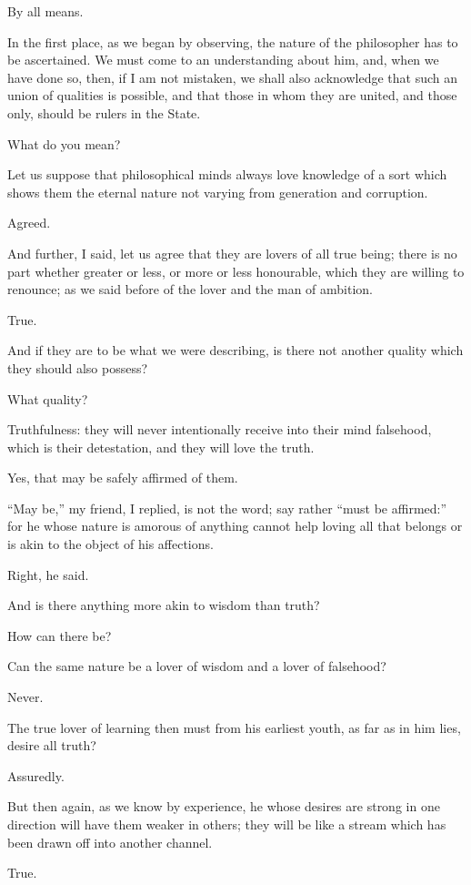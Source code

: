 By all means.

In the first place, as we began by observing, the nature of the
philosopher has to be ascertained. We must come to an understanding
about him, and, when we have done so, then, if I am not mistaken, we
shall also acknowledge that such an union of qualities is possible, and
that those in whom they are united, and those only, should be rulers in
the State.

What do you mean?

Let us suppose that philosophical minds always love knowledge of a sort
which shows them the eternal nature not varying from generation and
corruption.

Agreed.

And further, I said, let us agree that they are lovers of all true
being; there is no part whether greater or less, or more or less
honourable, which they are willing to renounce; as we said before of the
lover and the man of ambition.

True.

And if they are to be what we were describing, is there not another
quality which they should also possess?

What quality?

Truthfulness: they will never intentionally receive into their mind
falsehood, which is their detestation, and they will love the truth.

Yes, that may be safely affirmed of them.

``May be,'' my friend, I replied, is not the word; say rather ``must be
affirmed:'' for he whose nature is amorous of anything cannot help loving
all that belongs or is akin to the object of his affections.

Right, he said.

And is there anything more akin to wisdom than truth?

How can there be?

Can the same nature be a lover of wisdom and a lover of falsehood?

Never.

The true lover of learning then must from his earliest youth, as far as
in him lies, desire all truth?

Assuredly.

But then again, as we know by experience, he whose desires are strong
in one direction will have them weaker in others; they will be like a
stream which has been drawn off into another channel.

True.

